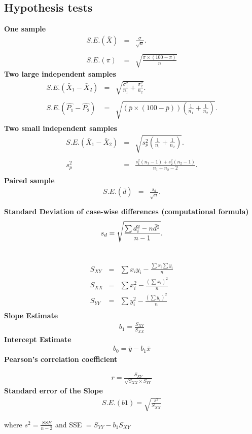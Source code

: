 \subsection*{Hypothesis tests}
{\bf One sample}
\begin{eqnarray*}
S.E.(\bar{X})&=&\frac{\sigma}{\sqrt{n}}.\\\\
S.E.(\pi)&=&\sqrt{\frac{\pi\times(100-\pi)}{n}}
\end{eqnarray*}
{\bf Two large independent samples}
\begin{eqnarray*}
S.E.(\bar{X}_1-\bar{X}_2)&=&\sqrt{\frac{\sigma^2_1}{n_1}+\frac{\sigma_2^2}{n_2}}.\\\\
S.E.(\hat{P_1}-\hat{P_2})&=&\sqrt{\left(\bar{p}\times(100-\bar{p})\right)\left(\frac{1}{n_1}+\frac{1}{n_2}\right)}.\\
\end{eqnarray*}
{\bf Two small independent samples}
\begin{eqnarray*}
S.E.(\bar{X}_1-\bar{X}_2)&=&\sqrt{s_p^2\left(\frac{1}{n_1}+\frac{1}{n_2}\right)}.\\\\
s_p^2&=&\frac{s_1^2(n_1-1)+s_2^2(n_2-1)}{n_1+n_2-2}.\\
\end{eqnarray*}
{\bf Paired sample}
\begin{eqnarray*}
S.E.(\bar{d})&=&\frac{s_d}{\sqrt{n}}.\\\\
\end{eqnarray*}
{\bf Standard Deviation of case-wise differences (computational formula)}
\begin{eqnarray*}
s_d = \sqrt{ {\sum d_i^2 - n\bar{d}^2 \over n-1}}.\\\\
\end{eqnarray*}



\begin{eqnarray*}
S_{XY} &=&
\sum x_iy_i - \frac{\sum x_i\sum y_i}{n}\\
S_{XX} &=&
\sum x_i^2 - \frac{(\sum x_i)^2}{n}\\
S_{YY} &=&
\sum y_i^2 - \frac{(\sum y_i)^2}{n}\\
\end{eqnarray*}
{\bf Slope Estimate}
\begin{eqnarray*}
b_1 = \frac{S_{XY}}{S_{XX}}
\end{eqnarray*}
{\bf Intercept Estimate}
\begin{eqnarray*}
 b_0 = \bar{y} -b_1\bar{x}
\end{eqnarray*}
{\bf Pearson's correlation coefficient}

\begin{eqnarray*}
r = \frac{S_{XY}}{\sqrt{S_{XX} \times S_{YY}}}
\end{eqnarray*}
{\bf Standard error of the Slope}
\begin{eqnarray*}
S.E.(b1) = \sqrt{\frac{s^2}{S_{XX}}}
\end{eqnarray*}

where $s^2 = \frac{SSE}{n-2}$
and SSE $= S_{YY} - b_1S_{XY}$
 